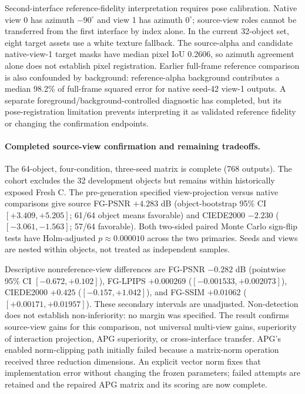 \documentclass[11pt]{article}
\begin{document}
Second-interface reference-fidelity interpretation requires pose calibration. Native
view 0 has azimuth $-90^\circ$ and view 1 has azimuth $0^\circ$; source-view roles
cannot be transferred from the first interface by index alone. In the current
32-object set, eight target assets use a white texture fallback. The source-alpha
and candidate native-view-1 target masks have median pixel IoU 0.2606, so azimuth
agreement alone does not establish pixel registration. Earlier full-frame
reference comparison is also confounded by background: reference-alpha
background contributes a median 98.2\% of full-frame squared error for native
seed-42 view-1 outputs. A separate foreground/background-controlled diagnostic
has completed, but its pose-registration limitation prevents interpreting it as
validated reference fidelity or changing the confirmation endpoints.

\paragraph{Completed source-view confirmation and remaining tradeoffs.}
The 64-object, four-condition, three-seed matrix is complete (768 outputs).
The cohort excludes the 32 development objects but remains within historically
exposed Fresh C. The pre-generation specified view-projection versus native
comparisons give source FG-PSNR $+4.283$ dB (object-bootstrap 95\% CI
$[+3.409,+5.205]$; 61/64 object means favorable) and CIEDE2000 $-2.230$
($[-3.061,-1.563]$; 57/64 favorable). Both two-sided paired Monte Carlo
sign-flip tests have Holm-adjusted $p\approx 0.000010$ across the two primaries.
Seeds and views are nested within objects, not treated as independent samples.

Descriptive nonreference-view differences are FG-PSNR $-0.282$ dB
(pointwise 95\% CI $[-0.672,+0.102]$), FG-LPIPS $+0.000269$
($[-0.001533,+0.002073]$), CIEDE2000 $+0.425$
($[-0.157,+1.042]$), and FG-SSIM $+0.01062$
($[+0.00171,+0.01957]$). These secondary intervals are unadjusted.
Non-detection does not establish non-inferiority: no margin was specified.
The result confirms source-view gains for this comparison, not universal
multi-view gains, superiority of interaction projection, APG superiority,
or cross-interface transfer. APG's enabled norm-clipping path initially
failed because a matrix-norm operation received three reduction dimensions.
An explicit vector norm fixes that implementation error without changing the
frozen parameters; failed attempts are retained and the repaired APG matrix
and its scoring are now complete.
\end{document}
